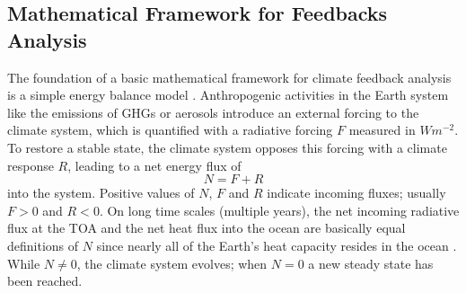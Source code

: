 \subsection{Mathematical Framework for Feedbacks Analysis}
\label{subsec:02:mathematical_framework_feedbacks}

The foundation of a basic mathematical framework for climate feedback analysis
is a simple energy balance model \autocite{Gregory2009, Roe2009}. Anthropogenic
activities in the Earth system like the emissions of \acp{GHG} or aerosols
introduce an external forcing to the climate system, which is quantified with a
radiative forcing $F$ measured in $\si{W m^{-2}}$. To restore a stable state,
the climate system opposes this forcing with a climate response $R$, leading to
a net energy flux of
\begin{equation}
  N = F + R
  \label{eq:02:N}
\end{equation}
into the system. Positive values of $N$, $F$ and $R$ indicate incoming fluxes;
usually $F > 0$ and $R < 0$. On long time scales (multiple years), the net
incoming radiative flux at the \ac{TOA} and the net heat flux into the ocean
are basically equal definitions of $N$ since nearly all of the Earth's heat
capacity resides in the ocean \autocite{Gregory2009}. While $N \neq 0$, the
climate system evolves; when $N = 0$ a new steady state has been reached.

